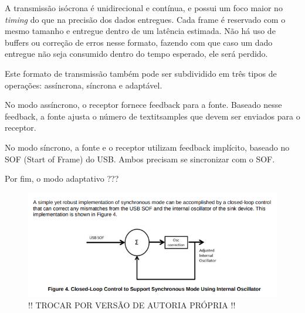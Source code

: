 A transmissão isócrona é unidirecional e contínua, e possui um foco maior no \textit{timing} do que na precisão dos dados entregues. Cada frame é reservado com o mesmo tamanho e entregue dentro de um latência estimada. Não há uso de buffers ou correção de erros nesse formato, fazendo com que caso um dado entregue não seja consumido dentro do tempo esperado, ele será perdido. 

Este formato de transmissão também pode ser subdividido em três tipos de operações: assíncrona, síncrona e adaptável.

No modo assíncrono, o receptor fornece feedback para a fonte. Baseado nesse feedback, a fonte ajusta o número de textit{samples} que devem ser enviados para o receptor.

No modo síncrono, a fonte e o receptor utilizam feedback implícito, baseado no SOF (Start of Frame) do USB. Ambos precisam se sincronizar com o SOF.

Por fim, o modo adaptativo ???

\begin{figure}[!h]
  \includegraphics[scale=0.5]{figuras/synchronousmode.png}
  \caption{!! TROCAR POR VERSÃO DE AUTORIA PRÓPRIA !!}
  \label{fig:synchronousMode}
\end{figure}





